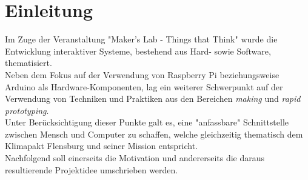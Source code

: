 \documentclass[.../Dokumentation.tex]{subfiles}
\begin{document}
\section{Einleitung}\label{sec-intr}
Im Zuge der Veranstaltung "Maker's Lab - Things that Think" wurde die 
Entwicklung interaktiver Systeme, bestehend aus Hard- sowie Software, 
thematisiert.\\
Neben dem Fokus auf der Verwendung von Raspberry Pi beziehungsweise Arduino als 
Hardware-Komponenten, lag ein weiterer Schwerpunkt auf der 
Verwendung von Techniken und Praktiken aus den Bereichen \textit{making} und 
\textit{rapid prototyping}.\\
Unter Berücksichtigung dieser Punkte galt es, eine "anfassbare" Schnittstelle 
zwischen Mensch und Computer zu schaffen, welche gleichzeitig thematisch dem 
Klimapakt Flensburg und seiner Mission entspricht.\\
Nachfolgend soll einerseits die Motivation und andererseits die daraus 
resultierende Projektidee umschrieben werden.
\end{document}
